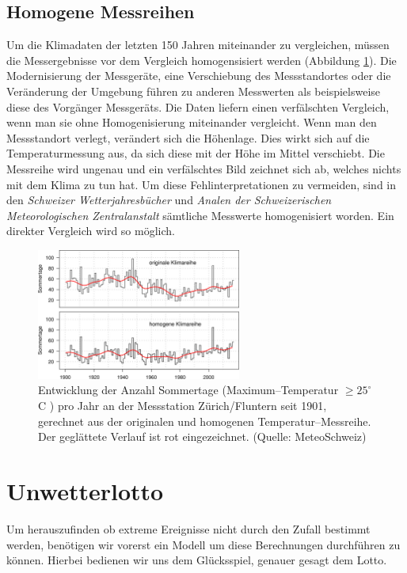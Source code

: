 \begin{refsection}
\subsection{Homogene Messreihen}
Um die Klimadaten der letzten 150 Jahren miteinander zu vergleichen, müssen die Messergebnisse vor dem Vergleich homogensisiert werden (Abbildung \ref{Homogen}). Die Modernisierung der Messgeräte,  eine Verschiebung des Messstandortes oder die Veränderung der Umgebung führen zu anderen Messwerten als beispielsweise diese des Vorgänger Messgeräts. Die Daten liefern einen verfälschten Vergleich, wenn man sie ohne Homogenisierung miteinander vergleicht.
Wenn man den Messstandort verlegt, verändert sich die Höhenlage. Dies wirkt sich auf die Temperaturmessung aus, da sich diese mit der Höhe im Mittel verschiebt. Die Messreihe wird ungenau und ein verfälschtes Bild zeichnet sich ab, welches nichts mit dem Klima zu tun hat.
Um diese Fehlinterpretationen zu vermeiden, sind in den \textit{Schweizer Wetterjahresbücher} und \textit{Analen der Schweizerischen Meteorologischen Zentralanstalt} sämtliche Messwerte homogenisiert worden. Ein direkter Vergleich wird so möglich.

\begin{figure}[htbp]
\centering
\includegraphics[width=0.6\textwidth]{extrem/Homogen.jpg}
\caption{Entwicklung der Anzahl Sommertage (Maximum--Temperatur $\ge 25^{\circ}$C ) pro Jahr an der Messstation Zürich/Fluntern seit 1901, gerechnet aus der originalen und homogenen Temperatur--Messreihe. Der geglättete Verlauf ist rot eingezeichnet. (Quelle: MeteoSchweiz)}
\label{Homogen}
\end{figure}


\section{Unwetterlotto}
Um herauszufinden ob extreme Ereignisse nicht durch den Zufall bestimmt werden, benötigen wir vorerst ein Modell um diese Berechnungen durchführen zu können.
Hierbei bedienen wir uns dem Glücksspiel, genauer gesagt dem Lotto.


\end{refsection}
